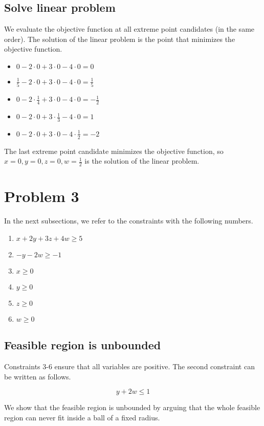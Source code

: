 \documentclass[12pt]{article}
\begin{document}
\subsection*{Solve linear problem}
We evaluate the objective function at all extreme point candidates (in the same order). The solution of the linear problem is the point that minimizes the objective function.
\begin{itemize}
	\item $0 - 2 \cdot 0 + 3 \cdot 0 - 4 \cdot 0 = 0$
	\item $\frac{1}{5} - 2 \cdot 0 + 3 \cdot 0 - 4 \cdot 0 = \frac{1}{5}$
	\item $0 - 2 \cdot \frac{1}{4} + 3 \cdot 0 - 4 \cdot 0 = -\frac{1}{2}$
	\item $0 - 2 \cdot 0 + 3 \cdot \frac{1}{3} - 4 \cdot 0 = 1$
	\item $0 - 2 \cdot 0 + 3 \cdot 0 - 4 \cdot \frac{1}{2} = -2$
\end{itemize}

The last extreme point candidate minimizes the objective function, so $x=0, y=0, z=0, w=\frac{1}{2}$ is the solution of the linear problem.

\section*{Problem 3}
In the next subsections, we refer to the constraints with the following numbers.

\begin{enumerate}
	\item $x + 2y + 3z + 4w \geq 5$
	\item $-y -2w \geq -1$
	\item $x \geq 0$
	\item $y \geq 0$
	\item $z \geq 0$
	\item $w \geq 0$
\end{enumerate}

\subsection*{Feasible region is unbounded}
Constraints 3-6 ensure that all variables are positive. The second constraint can be written as follows.

$$y + 2w \leq 1$$

We show that the feasible region is unbounded by arguing that the whole feasible region can never fit inside a ball of a fixed radius.
\end{document}
